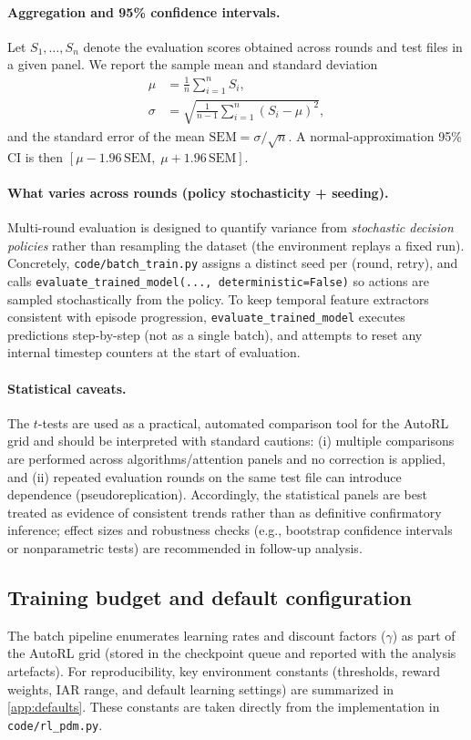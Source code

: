 \documentclass[11pt]{article}
\begin{document}
\paragraph{Aggregation and 95\% confidence intervals.}
Let $S_1,\ldots,S_n$ denote the evaluation scores obtained across rounds and test files in a given panel. We report the sample mean and standard deviation
\begin{align}
\mu &= \frac{1}{n}\sum_{i=1}^{n} S_i,\\
\sigma &= \sqrt{\frac{1}{n-1}\sum_{i=1}^{n}(S_i-\mu)^2},
\end{align}
and the standard error of the mean $\mathrm{SEM}=\sigma/\sqrt{n}$. A normal-approximation 95\% CI is then $[\mu-1.96\,\mathrm{SEM},\;\mu+1.96\,\mathrm{SEM}]$.

\paragraph{What varies across rounds (policy stochasticity + seeding).}
Multi-round evaluation is designed to quantify variance from \emph{stochastic decision policies} rather than resampling the dataset (the environment replays a fixed run). Concretely, \texttt{code/batch\_train.py} assigns a distinct seed per (round, retry), and calls \texttt{evaluate\_trained\_model(..., deterministic=False)} so actions are sampled stochastically from the policy. To keep temporal feature extractors consistent with episode progression, \texttt{evaluate\_trained\_model} executes predictions step-by-step (not as a single batch), and attempts to reset any internal timestep counters at the start of evaluation.

\paragraph{Statistical caveats.}
The $t$-tests are used as a practical, automated comparison tool for the AutoRL grid and should be interpreted with standard cautions: (i) multiple comparisons are performed across algorithms/attention panels and no correction is applied, and (ii) repeated evaluation rounds on the same test file can introduce dependence (pseudoreplication). Accordingly, the statistical panels are best treated as evidence of consistent trends rather than as definitive confirmatory inference; effect sizes and robustness checks (e.g., bootstrap confidence intervals or nonparametric tests) are recommended in follow-up analysis.

\subsection{Training budget and default configuration}
The batch pipeline enumerates learning rates and discount factors ($\gamma$) as part of the AutoRL grid (stored in the checkpoint queue and reported with the analysis artefacts). For reproducibility, key environment constants (thresholds, reward weights, IAR range, and default learning settings) are summarized in \cref{app:defaults}. These constants are taken directly from the implementation in \texttt{code/rl\_pdm.py}.
\end{document}
